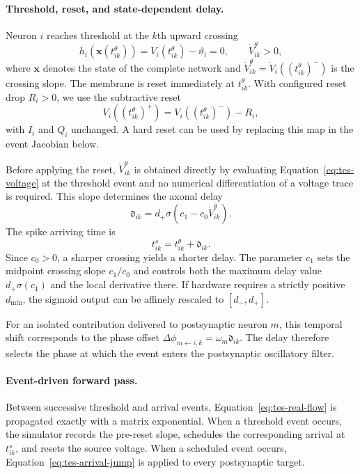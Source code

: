 \paragraph{Threshold, reset, and state-dependent delay.}
Neuron $i$ reaches threshold at the $k$th upward crossing
\begin{equation}
    h_i\!\left(\mathbf{x}(t^\theta_{ik})\right)
    =V_i(t^\theta_{ik})-\vartheta_i=0,
    \qquad
    \dot V^\theta_{ik}>0,
    \label{eq:tes-threshold}
\end{equation}
where $\mathbf{x}$ denotes the state of the complete network and
$\dot V^\theta_{ik}=
\dot V_i((t^\theta_{ik})^-)$ is the crossing slope. The membrane is reset
immediately at $t^\theta_{ik}$. With configured reset drop $R_i>0$, we use the
subtractive reset
\begin{equation}
    V_i\!\left((t^\theta_{ik})^+\right)
      =V_i\!\left((t^\theta_{ik})^-\right)-R_i,
    \label{eq:tes-reset}
\end{equation}
with $I_i$ and $Q_i$ unchanged. A hard reset can be used by replacing this map
in the event Jacobian below.

Before applying the reset, $\dot V^\theta_{ik}$ is obtained directly by
evaluating Equation~\eqref{eq:tes-voltage} at the threshold event and no
numerical differentiation of a voltage trace is required. This slope determines
the axonal delay
\begin{equation}
    \mathfrak{d}_{ik}
      =d_{+}\sigma\!\left(c_1-c_0\dot V^\theta_{ik}\right).
    \label{eq:tes-delay-method}
\end{equation}
The spike arriving time is
\begin{equation}
    t^s_{ik}=t^\theta_{ik}+\mathfrak{d}_{ik}.
    \label{eq:tes-final-spike-time}
\end{equation}
Since $c_0>0$, a sharper crossing yields a shorter delay. The parameter $c_1$
sets the midpoint crossing slope $c_1/c_0$ and controls both the maximum delay
value $d_{+}\sigma(c_1)$ and the local derivative there.
If hardware requires a
strictly positive $d_{\min}$, the sigmoid output can be affinely rescaled to
$[d_{-},d_{+}]$.

For an isolated contribution delivered to postsynaptic neuron $m$, this
temporal shift corresponds to the phase offset
    $\Delta\phi_{m\leftarrow i,k}=\omega_m\mathfrak{d}_{ik}.
$
The delay therefore selects the phase at which the event enters the
postsynaptic oscillatory filter.

\paragraph{Event-driven forward pass.}
Between successive threshold and arrival events, Equation~\eqref{eq:tes-real-flow} is propagated exactly with a matrix exponential.  When a threshold event occurs, the simulator records the pre-reset slope, schedules the corresponding arrival at $t^s_{ik}$, and resets the source voltage. When a scheduled event occurs, Equation~\eqref{eq:tes-arrival-jump} is applied to every postsynaptic target. 


